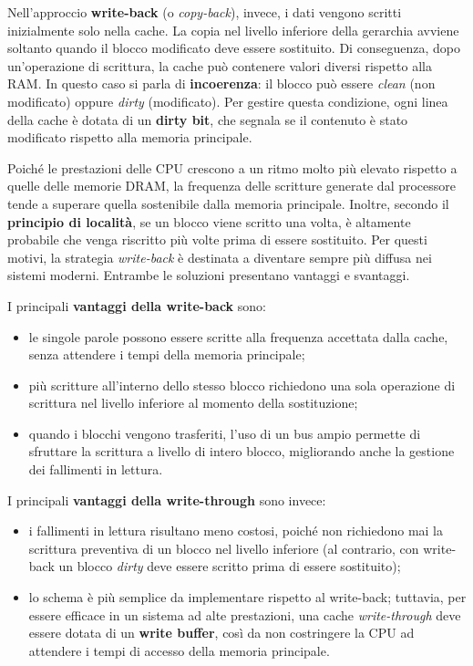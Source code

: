 \noindent
Nell’approccio \textbf{write-back} (o \textit{copy-back}), invece, i dati vengono scritti inizialmente solo nella cache. La copia nel livello inferiore della gerarchia avviene soltanto quando il blocco modificato deve essere sostituito. Di conseguenza, dopo un'operazione di scrittura, la cache può contenere valori diversi rispetto alla RAM. In questo caso si parla di \textbf{incoerenza}: il blocco può essere \textit{clean} (non modificato) oppure \textit{dirty} (modificato). Per gestire questa condizione, ogni linea della cache è dotata di un \textbf{dirty bit}, che segnala se il contenuto è stato modificato rispetto alla memoria principale.  

\noindent
Poiché le prestazioni delle CPU crescono a un ritmo molto più elevato rispetto a quelle delle memorie DRAM, la frequenza delle scritture generate dal processore tende a superare quella sostenibile dalla memoria principale. Inoltre, secondo il \textbf{principio di località}, se un blocco viene scritto una volta, è altamente probabile che venga riscritto più volte prima di essere sostituito. Per questi motivi, la strategia \textit{write-back} è destinata a diventare sempre più diffusa nei sistemi moderni. Entrambe le soluzioni presentano vantaggi e svantaggi.  

\noindent
I principali \textbf{vantaggi della write-back} sono:  
\begin{itemize}
  \item le singole parole possono essere scritte alla frequenza accettata dalla cache, senza attendere i tempi della memoria principale;  
  \item più scritture all'interno dello stesso blocco richiedono una sola operazione di scrittura nel livello inferiore al momento della sostituzione;  
  \item quando i blocchi vengono trasferiti, l'uso di un bus ampio permette di sfruttare la scrittura a livello di intero blocco, migliorando anche la gestione dei fallimenti in lettura.  
\end{itemize}

\noindent
I principali \textbf{vantaggi della write-through} sono invece:  
\begin{itemize}
  \item i fallimenti in lettura risultano meno costosi, poiché non richiedono mai la scrittura preventiva di un blocco nel livello inferiore (al contrario, con write-back un blocco \textit{dirty} deve essere scritto prima di essere sostituito);  
  \item lo schema è più semplice da implementare rispetto al write-back; tuttavia, per essere efficace in un sistema ad alte prestazioni, una cache \textit{write-through} deve essere dotata di un \textbf{write buffer}, così da non costringere la CPU ad attendere i tempi di accesso della memoria principale.  
\end{itemize}
